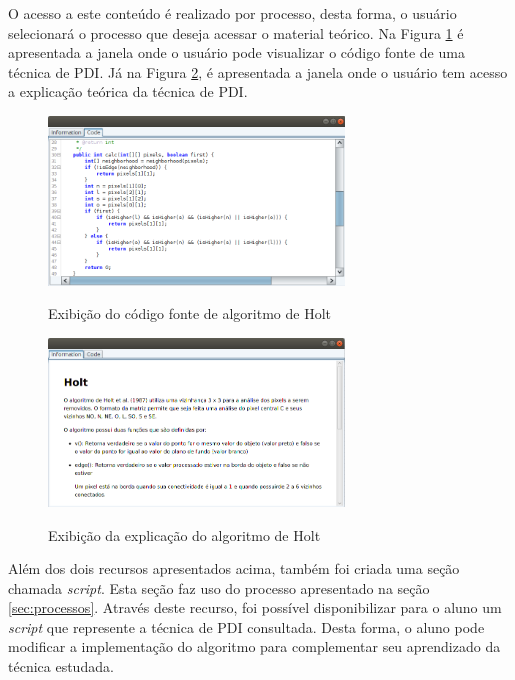 \documentclass[
	12pt,				%
	oneside,			%
	a4paper,			%
	english,			%
	french,				%
	spanish,			%
	brazil,				%
	]{abntex2}
\begin{document}
O acesso a este conteúdo é realizado por processo, desta forma, o usuário selecionará o processo que deseja acessar o material teórico. Na Figura \ref{fig:visnodeCode} é apresentada a janela onde o usuário pode visualizar o código fonte de uma técnica de PDI. Já na Figura \ref{fig:visnodeInformation}, é apresentada a janela onde o usuário tem acesso a explicação teórica da técnica de PDI.

\begin{figure}[ht]
\centering
\caption{Exibição do código fonte de algoritmo de Holt}
\includegraphics[width=0.7\textwidth]{imagens/visnode_code.png}
\sourceAuthor
\label{fig:visnodeCode}
\end{figure}

\begin{figure}[ht]
\centering
\caption{Exibição da explicação do algoritmo de Holt}
\includegraphics[width=0.7\textwidth]{imagens/visnode_information.png}
\sourceAuthor
\label{fig:visnodeInformation}
\end{figure}

Além dos dois recursos apresentados acima, também foi criada uma seção chamada \textit{script}. Esta seção faz uso do processo apresentado na seção \ref{sec:processos}. Através deste recurso, foi possível disponibilizar para o aluno um \textit{script} que represente a técnica de PDI consultada. Desta forma, o aluno pode modificar a implementação do algoritmo para complementar seu aprendizado da técnica estudada.
\end{document}
